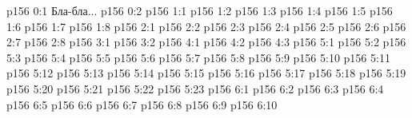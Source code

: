 \author{Промежуточные создания}
\vs p156 0:1  Бла-бла...
\vs p156 0:2 
\vs p156 1:1 
\vs p156 1:2 
\vs p156 1:3 
\vs p156 1:4 
\vs p156 1:5 
\vs p156 1:6 
\vs p156 1:7 
\vs p156 1:8 \pc 
{}
\vs p156 2:1 
\vs p156 2:2 \pc 
\vs p156 2:3 
\vs p156 2:4 
\vs p156 2:5 \pc 
\vs p156 2:6 \pc 
\vs p156 2:7 
\vs p156 2:8 
\vs p156 3:1 
\vs p156 3:2 
\vs p156 4:1 
\vs p156 4:2 
\vs p156 4:3 
\vs p156 5:1 
\vs p156 5:2 
\vs p156 5:3 
\vs p156 5:4 
\vs p156 5:5 
\vs p156 5:6 
\vs p156 5:7 
\vs p156 5:8 
\vs p156 5:9 
\vs p156 5:10 
\vs p156 5:11 
\vs p156 5:12 
\vs p156 5:13 
\vs p156 5:14 
\vs p156 5:15 
\vs p156 5:16 
\vs p156 5:17 
\vs p156 5:18 
\vs p156 5:19 
\vs p156 5:20 
\vs p156 5:21 
\vs p156 5:22 \pc 
\vs p156 5:23 
\vs p156 6:1 
\vs p156 6:2 
\vs p156 6:3 
\vs p156 6:4 
\vs p156 6:5 \pc 
\vs p156 6:6 
\vs p156 6:7 
\vs p156 6:8 
\vs p156 6:9 
\vs p156 6:10 
\quizlink
